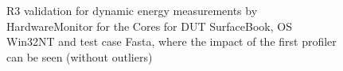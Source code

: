 \begin{figure}
                            \caption{R3 validation for dynamic energy measurements by HardwareMonitor for the Cores for DUT SurfaceBook, OS Win32NT and test case Fasta, where the impact of the first profiler can be seen (without outliers)} \label{fig:SurfaceBook_HardwareMonitor_Cores_R3_dynamic_energy_without_outliers_Win32NT_avg_watts}
                            \end{figure}
                            